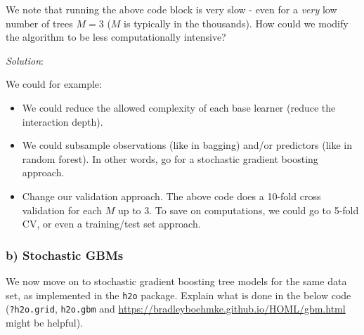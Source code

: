 \documentclass[
]{article}
\providecommand{\tightlist}{%
  \setlength{\itemsep}{0pt}\setlength{\parskip}{0pt}}
\begin{document}
We note that running the above code block is very slow - even for a
\emph{very} low number of trees \(M=3\) (\(M\) is typically in the
thousands). How could we modify the algorithm to be less computationally
intensive?

\emph{Solution}:

We could for example:

\begin{itemize}
\tightlist
\item
  We could reduce the allowed complexity of each base learner (reduce
  the interaction depth).
\item
  We could subsample observations (like in bagging) and/or predictors
  (like in random forest). In other words, go for a stochastic gradient
  boosting approach.
\item
  Change our validation approach. The above code does a 10-fold cross
  validation for each \(M\) up to \(3\). To save on computations, we
  could go to 5-fold CV, or even a training/test set approach.
\end{itemize}

\hypertarget{b-stochastic-gbms}{%
\subsubsection{b) Stochastic GBMs}\label{b-stochastic-gbms}}

We now move on to stochastic gradient boosting tree models for the same
data set, as implemented in the \texttt{h2o} package. Explain what is
done in the below code (\texttt{?h2o.grid}, \texttt{h2o.gbm} and
\url{https://bradleyboehmke.github.io/HOML/gbm.html} might be helpful).
\end{document}
